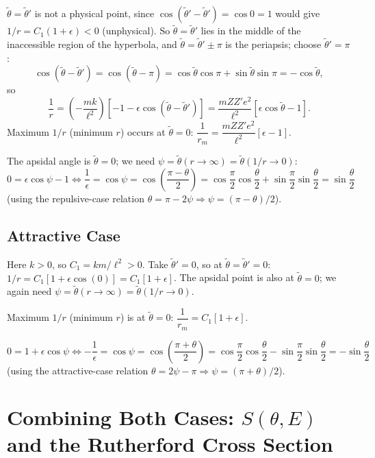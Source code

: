 \documentclass[11pt]{article}
\begin{document}
$\tilde\theta = \tilde\theta'$ is not a physical point, since $\cos(\tilde\theta'-\tilde\theta')=\cos 0=1$
would give $1/r = C_1(1+\epsilon) < 0$ (unphysical). So $\tilde\theta=\tilde\theta'$ lies in the
middle of the inaccessible region of the hyperbola, and $\tilde\theta = \tilde\theta' \pm \pi$ is
the periapsis; choose $\tilde\theta' = \pi$:
\[
\cos(\tilde\theta - \tilde\theta') = \cos(\tilde\theta-\pi) = \cos\tilde\theta\cos\pi + \sin\tilde\theta\sin\pi = -\cos\tilde\theta,
\]
so
\[
\frac{1}{r} = \left(-\frac{mk}{\ell^2}\right)\left[-1-\epsilon\cos(\tilde\theta-\tilde\theta')\right]
= \frac{mZZ'e^2}{\ell^2}\left[\epsilon\cos\tilde\theta - 1\right].
\]
Maximum $1/r$ (minimum $r$) occurs at $\tilde\theta=0$:
$\dfrac{1}{r_m} = \dfrac{mZZ'e^2}{\ell^2}[\epsilon-1]$.

The apsidal angle is $\tilde\theta = 0$; we need $\psi = \tilde\theta(r\to\infty) = \tilde\theta(1/r\to0)$:
\[
0 = \epsilon\cos\psi - 1 \Leftrightarrow \frac{1}{\epsilon} = \cos\psi = \cos\left(\frac{\pi-\theta}{2}\right)
= \cos\frac{\pi}{2}\cos\frac{\theta}{2} + \sin\frac{\pi}{2}\sin\frac{\theta}{2} = \sin\frac{\theta}{2}
\]
(using the repulsive-case relation $\theta = \pi-2\psi \Rightarrow \psi = (\pi-\theta)/2$).

\subsection{Attractive Case}

Here $k>0$, so $C_1 = km/\ell^2 > 0$. Take $\tilde\theta'=0$, so at $\tilde\theta=\tilde\theta'=0$:
$1/r = C_1[1+\epsilon\cos(0)] = C_1[1+\epsilon]$. The apsidal point is also at $\tilde\theta=0$;
we again need $\psi = \tilde\theta(r\to\infty) = \tilde\theta(1/r\to0)$.

Maximum $1/r$ (minimum $r$) is at $\tilde\theta=0$: $\dfrac{1}{r_m} = C_1[1+\epsilon]$.

\[
0 = 1+\epsilon\cos\psi \Leftrightarrow -\frac{1}{\epsilon} = \cos\psi = \cos\left(\frac{\pi+\theta}{2}\right)
= \cos\frac{\pi}{2}\cos\frac{\theta}{2} - \sin\frac{\pi}{2}\sin\frac{\theta}{2} = -\sin\frac{\theta}{2}
\]
(using the attractive-case relation $\theta = 2\psi-\pi \Rightarrow \psi = (\pi+\theta)/2$).

\section{Combining Both Cases: $S(\theta,E)$ and the Rutherford Cross Section}
\end{document}
